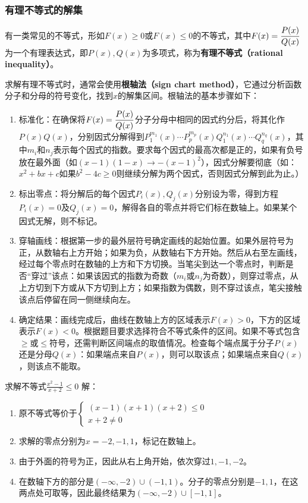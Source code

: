 \subsubsection{有理不等式的解集}

有一类常见的不等式，形如$F(x) \geq 0$或$F(x) \leq 0$的不等式，其中$\displaystyle F(x)={P(x)\over Q(x)}$为一个有理表达式，即$P(x),Q(x)$为多项式，称为\textbf{有理不等式（rational inequality）}。

求解有理不等式时，通常会使用\textbf{根轴法（sign chart method）}，它通过分析函数分子和分母的符号变化，找到$x$的解集区间。根轴法的基本步骤如下：
\begin{enumerate}
\item 标准化：在确保将$\displaystyle F(x)={P(x)\over Q(x)}$分子分母中相同的因式约分后，将其化作$P(x)Q(x)$，分别因式分解得到$P^{m_1}_1(x)\cdots P^{m_p}_p(x)Q^{n_1}_1(x)\cdots Q^{n_q}_q(x)$，其中$m_i$和$n_j$表示每个因式的指数。要求每个因式的最高次都是正的，如果有负号放在最外面（如$(x-1)(1-x)\to-(x-1)^2$），因式分解要彻底（如：$x^2+bx+c$如果$b^2-4c\geq0$则继续分解为两个因式，否则因式分解到此为止。）
\item 标出零点：将分解后的每个因式$P_i(x),Q_j(x)$分别设为零，得到方程$P_i(x) = 0$及$Q_j(x) = 0$，解得各自的零点并将它们标在数轴上。如果某个因式无解，则不标记。
\item 穿轴画线：根据第一步的最外层符号确定画线的起始位置。如果外层符号为正，从数轴右上方开始；如果为负，从数轴右下方开始。然后从右至左画线，经过每个零点时在数轴的上方和下方切换。当笔尖到达一个零点时，判断是否“穿过”该点：如果该因式的指数为奇数（$m_i$或$n_j$为奇数），则穿过零点，从上方切到下方或从下方切到上方；如果指数为偶数，则不穿过该点，笔尖接触该点后停留在同一侧继续向左。
\item 确定结果：画线完成后，曲线在数轴上方的区域表示$F(x) > 0$，下方的区域表示$F(x) < 0$。根据题目要求选择符合不等式条件的区间。如果不等式包含$\geq$或$\leq$符号，还需判断区间端点的取值情况。检查每个端点属于分子$P(x)$还是分母$Q(x)$：如果端点来自$P(x)$，则可以取该点；如果端点来自$Q(x)$，则该点不能取。
\end{enumerate}
\begin{example}{求解不等式$\displaystyle \frac{x^2 - 1}{x + 2} \leq 0$}
解：
\begin{enumerate}
\item 原不等式等价于$\begin{cases}(x-1)(x+1)(x+2)\leq0 \\ x+2\neq0\end{cases}$
\item 求解的零点分别为$x=-2,-1,1$，标记在数轴上。
\item 由于外面的符号为正，因此从右上角开始，依次穿过$1,-1,-2$。
\item 在数轴下方的部分是$(-\infty,-2)\cup(-1,1)$。分子的零点分别是$-1,1$，在这两点处可取等，因此最终结果为$(-\infty,-2)\cup[-1,1]$。
\end{enumerate}
\end{example}

